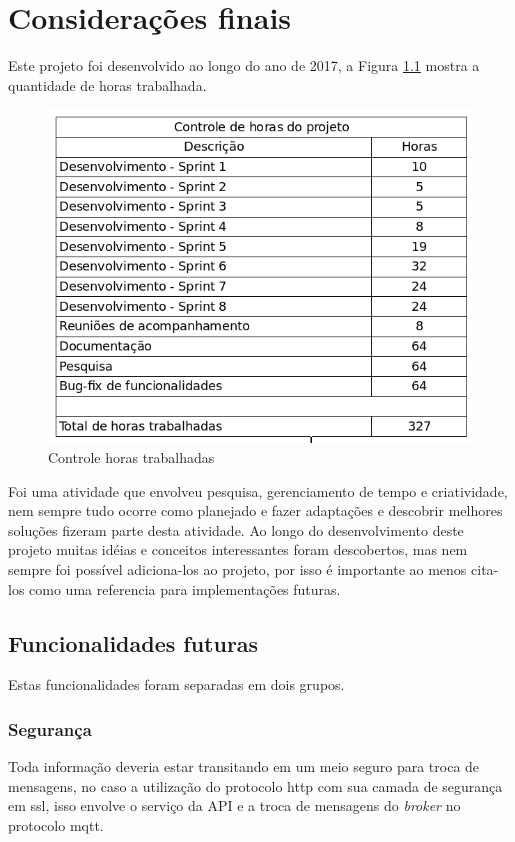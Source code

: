 \chapter{Considerações finais}
Este projeto foi desenvolvido ao longo do ano de 2017, a Figura \ref{horas-trabalhadas} mostra a quantidade de horas trabalhada.

\begin{figure}[H]
\caption{\label{horas-trabalhadas} Controle horas trabalhadas}
\includegraphics[scale=0.4]{img/horas-trabalhadas.png}
\end{figure}

Foi uma atividade que envolveu pesquisa, gerenciamento de tempo e criatividade, nem sempre tudo ocorre como planejado e fazer adaptações e descobrir melhores soluções fizeram parte desta atividade. Ao longo do desenvolvimento deste projeto muitas idéias e conceitos interessantes foram descobertos, mas nem sempre foi possível adiciona-los ao projeto, por isso é importante ao menos cita-los como uma referencia para implementações futuras.

\section{Funcionalidades futuras}
Estas funcionalidades foram separadas em dois grupos.

\subsection{Segurança}
Toda informação deveria estar transitando em um meio seguro para troca de mensagens, no caso a utilização do protocolo http com sua camada de segurança em ssl, isso envolve o serviço da API e a troca de mensagens do \textit{broker} no protocolo mqtt.

